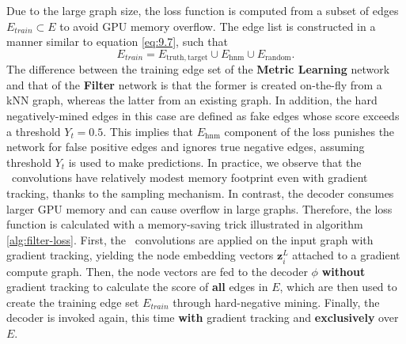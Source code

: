 Due to the large graph size, the loss function is computed from a subset of edges $E_{train}\subset {E}$ to avoid GPU memory overflow. 
The edge list is constructed in a manner similar to equation \eqref{eq:9.7}, such that
\begin{equation}
    \label{eq:10.3}
    E_{train} = E_{\mathrm{truth,target}} \cup E_{\mathrm{hnm}} \cup E_{\mathrm{random}}.
\end{equation}
The difference between the training edge set of the \textbf{Metric Learning} network and that of the \textbf{Filter} network is that the former is created on-the-fly from a kNN graph, whereas the latter from an existing graph. 
In addition, the hard negatively-mined edges in this case are defined as fake edges whose score exceeds a threshold $Y_t=0.5$. 
This implies that $E_{\mathrm{hnm}}$ component of the loss punishes the network for false positive edges and ignores true negative edges, assuming threshold $Y_t$ is used to make predictions.
In practice, we observe that the \graphsage~convolutions have relatively modest memory footprint even with gradient tracking, thanks to the sampling mechanism. 
In contrast, the decoder consumes larger GPU memory and can cause overflow in large graphs. 
Therefore, the loss function is calculated with a memory-saving trick illustrated in algorithm \ref{alg:filter-loss}.
First, the \graphsage~convolutions are applied on the input graph with gradient tracking, yielding the node embedding vectors $\mathbf{z}_i^L$ attached to a gradient compute graph.
Then, the node vectors are fed to the decoder $\phi$ \textbf{without} gradient tracking to calculate the score of \textbf{all} edges in ${E}$, which are then used to create the training edge set $E_{train}$ through hard-negative mining. 
Finally, the decoder is invoked again, this time \textbf{with} gradient tracking and \textbf{exclusively} over $E$. 

